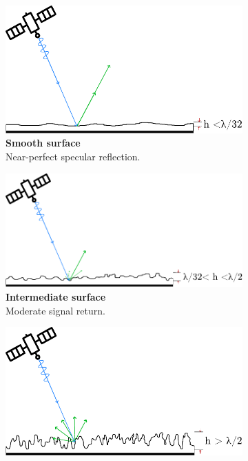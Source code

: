 \begin{figure} [htbp]
    \centering
    \begin{subfigure}{0.31\textwidth}
        \includegraphics[width=\textwidth]{Figures/Theory/smoothSurface.pdf}
        \caption{\textbf{Smooth surface} \\ Near-perfect specular reflection.}
        \label{fig:theory.data.surface.smooth}
    \end{subfigure}   
    \begin{subfigure}{0.35\textwidth}
        \includegraphics[width=\textwidth]{Figures/Theory/intermediateSurface.pdf}
        \caption{\textbf{Intermediate surface} \\ Moderate signal return.}
        \label{fig:theory.data.surface.intermediate}
    \end{subfigure} 
    \begin{subfigure}{0.31\textwidth}
        \includegraphics[width=\textwidth]{Figures/Theory/roughSurface.pdf}

\end{subfigure}
\end{figure}
